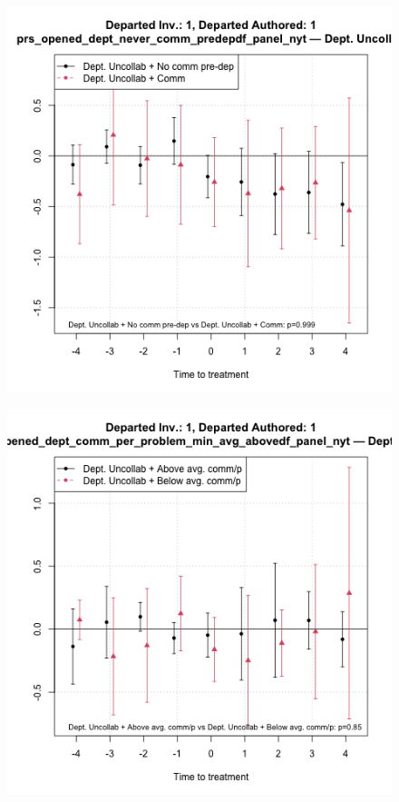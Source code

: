 \begin{figure}[htbp]
    \begin{minipage}[b]{0.32\textwidth}
    \centering
    \includegraphics[width=\textwidth]{temp/output/collab_imp/auth1_inv1_cs_norm_prs_opened_dept_never_comm_predep_Dept.Uncollab.png}
    \label{fig:prs_opened_comm_uncollab_int_predep}
    \end{minipage}
    \hfill
    \begin{minipage}[b]{0.32\textwidth}
        \centering
        \includegraphics[width=\textwidth]{temp/output/collab_imp/auth1_inv1_cs_norm_prs_opened_dept_comm_per_problem_min_avg_above_Dept.Uncollab.png}

\end{minipage}
\end{figure}
